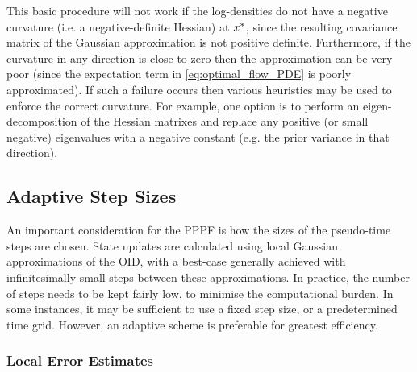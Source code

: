 \documentclass{article}
\begin{document}
This basic procedure will not work if the log-densities do not have a negative curvature (i.e. a negative-definite Hessian) at $x_{}^*$, since the resulting covariance matrix of the Gaussian approximation is not positive definite. Furthermore, if the curvature in any direction is close to zero then the approximation can be very poor (since the expectation term in \eqref{eq:optimal_flow_PDE} is poorly approximated). If such a failure occurs then various heuristics may be used to enforce the correct curvature. For example, one option is to perform an eigen-decomposition of the Hessian matrixes and replace any positive (or small negative) eigenvalues with a negative constant (e.g. the prior variance in that direction).
%







\subsection{Adaptive Step Sizes}

An important consideration for the PPPF is how the sizes of the pseudo-time steps are chosen. State updates are calculated using local Gaussian approximations of the OID, with a best-case generally achieved with infinitesimally small steps between these approximations. In practice, the number of steps needs to be kept fairly low, to minimise the computational burden. In some instances, it may be sufficient to use a fixed step size, or a predetermined time grid. However, an adaptive scheme is preferable for greatest efficiency.

\subsubsection{Local Error Estimates}
\end{document}
